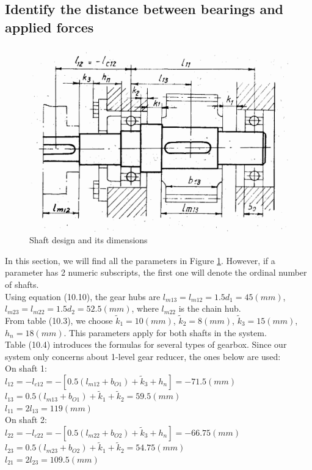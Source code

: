 \subsection{Identify the distance between bearings and applied forces}

\begin{figure}[ht]
	\centering	\includegraphics[width=150mm]{shaft1.png}
	\caption{Shaft design and its dimensions}
	\label{shaft}
\end{figure}

In this section, we will find all the parameters in Figure \ref{shaft}. However, if a parameter has 2 numeric subscripts, the first one will denote the ordinal number of shafts.\\
Using equation (10.10), the gear hubs are $ l_{m13} = l_{m12} = 1.5d_1 =  45\unit{(mm)} $, $ l_{m23} = l_{m22} = 1.5d_2 = 52.5\unit{(mm)} $, where $ l_{m22} $ is the chain hub.\\
From table (10.3), we choose $ \tilde{k}_1=10\unit{(mm)}$, $ \tilde{k}_2=8\unit{(mm)} $, $ \tilde{k}_3=15\unit{(mm)} $, $ h_n=18\unit{(mm)} $. This parameters apply for both shafts in the system.\\
Table (10.4) introduces the formulas for several types of gearbox. Since our system only concerns about 1-level gear reducer, the ones below are used:\\
On shaft 1:\\
$ l_{12} = -l_{c12} = -\left[ 0.5(l_{m12}+b_{O1})+\tilde{k}_3+h_n  \right] = -71.5 \unit{(mm)} $\\
$ l_{13} = 0.5(l_{m13}+b_{O1})+\tilde{k}_1+\tilde{k}_2 = 59.5 \unit{(mm)} $\\
$ l_{11} = 2l_{13} = 119 \unit{(mm)}$\\
On shaft 2:\\
$ l_{22} = -l_{c22} = -\left[ 0.5(l_{m22}+b_{O2})+\tilde{k}_3+h_n \right] = -66.75 \unit{(mm)} $\\
$ l_{23} = 0.5(l_{m23}+b_{O2})+\tilde{k}_1+\tilde{k}_2 = 54.75 \unit{(mm)} $\\
$ l_{21} = 2l_{23} = 109.5 \unit{(mm)}$

